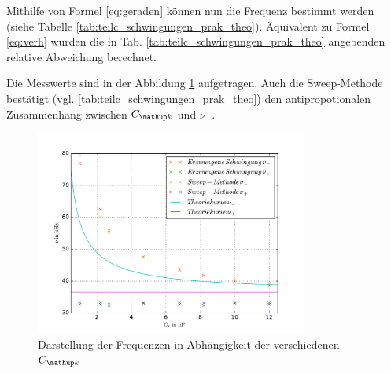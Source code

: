 Mithilfe von Formel \eqref{eq:geraden} können nun die Frequenz bestimmt werden (siehe Tabelle \ref{tab:teilc_schwingungen_prak_theo}).
Äquivalent zu Formel \eqref{eq:verh} wurden die in Tab. \ref{tab:teilc_schwingungen_prak_theo} angebenden relative Abweichung berechnet.

Die Messwerte sind in der Abbildung \ref{fig: plot} aufgetragen.
Auch die Sweep-Methode bestätigt (vgl. \ref{tab:teilc_schwingungen_prak_theo}) den antipropotionalen
Zusammenhang zwischen $C\ua{k}$ und $\nu_-$. %
\begin{figure}
  \centering
  \includegraphics[width=0.8\textwidth]{pics/plot_frequenzen.pdf}
  \caption{Darstellung der Frequenzen in Abhängigkeit der verschiedenen $C\ua{k}$}
  \label{fig: plot}
\end{figure}
